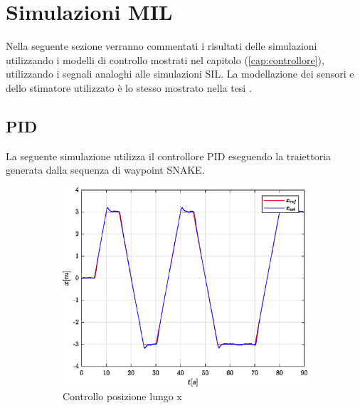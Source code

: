 \section{Simulazioni MIL}
Nella seguente sezione verranno commentati i risultati delle simulazioni utilizzando i modelli di controllo mostrati nel capitolo (\ref{cap:controllore}), utilizzando i segnali analoghi alle simulazioni SIL. La modellazione dei sensori e dello stimatore utilizzato è lo stesso mostrato nella tesi \cite{DesTestCarm}. 

\subsection{PID}
La seguente simulazione utilizza il controllore PID eseguendo la traiettoria generata dalla sequenza di waypoint SNAKE.
\begin{figure}
	\centering
	\begin{subfigure}{0.45\textwidth}
		\centering
		\includegraphics[width=1\textwidth]{Simulazioni/Figure/PID/SNAKE_MIL/PositionControlXPos}
		\caption{Controllo posizione lungo x}
		\label{fig:SNAKEerrposxPID_MIL}
	\end{subfigure}
	\hfill
	\begin{subfigure}{0.45\textwidth}
		\centering

\end{subfigure}
\end{figure}

